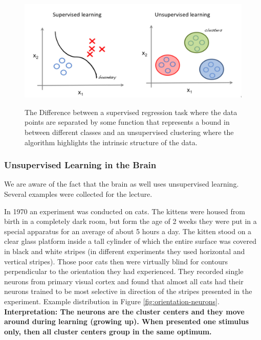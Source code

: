 \documentclass[main]{subfiles}
\begin{document}
\begin{figure}[H]
	\centering
	\includegraphics[width=0.99\linewidth]{07_UnsupervisedAndSelfsupervisedLearning/figures/sup-unsup-comp.png}
	\label{fig:sup-unsup-comp}
	\caption{The Difference between a supervised regression task where the data points are separated by some function that represents a bound in between different classes and an unsupervised clustering where the algorithm highlights the intrinsic structure of the data.}
\end{figure}

\subsubsection{Unsupervised Learning in the Brain}
We are aware of the fact that the brain as well uses unsupervised learning. Several examples were collected for the lecture.

In 1970 an experiment was conducted on cats. The kittens were housed from birth in a completely dark room, but form the age of 2 weeks they were put in a special apparatus for an average of about 5 hours a day. The kitten stood on a clear glass platform inside a tall cylinder of which the entire surface was covered in black and white stripes (in different experiments they used horizontal and vertical stripes). Those poor cats then were virtually blind for contours perpendicular to the orientation they had experienced. They recorded single neurons from primary visual cortex and found that almost all cats had their neurons trained to be most selective in direction of the stripes presented in the experiment. Example distribution in Figure \ref{fig:orientation-neurons}. \textbf{Interpretation: The neurons are the cluster centers and they move around during learning (growing up). When presented one stimulus only, then all cluster centers group in the same optimum.}
\end{document}
